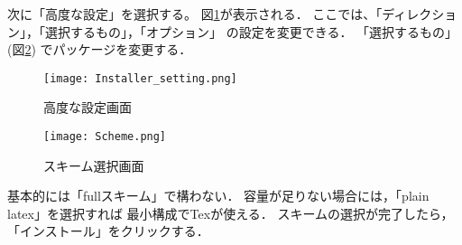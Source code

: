 次に「高度な設定」を選択する。
図\ref{fig:installer_setting}が表示される．
ここでは、「ディレクション」，「選択するもの」，「オプション」
の設定を変更できる．
「選択するもの」(図\ref{fig:scheme})
でパッケージを変更する．

\begin{figure}[H]
  \centering
  \texttt{[image: Installer\_setting.png]}
  \caption{高度な設定画面}
  \label{fig:installer_setting}
\end{figure}

\begin{figure}[H]
  \centering
  \texttt{[image: Scheme.png]}
  \caption{スキーム選択画面}
  \label{fig:scheme}
\end{figure}

基本的には「fullスキーム」で構わない．
容量が足りない場合には，「plain latex」を選択すれば
最小構成でTexが使える．
スキームの選択が完了したら，「インストール」をクリックする．

\caption{VSCodeの導入}
